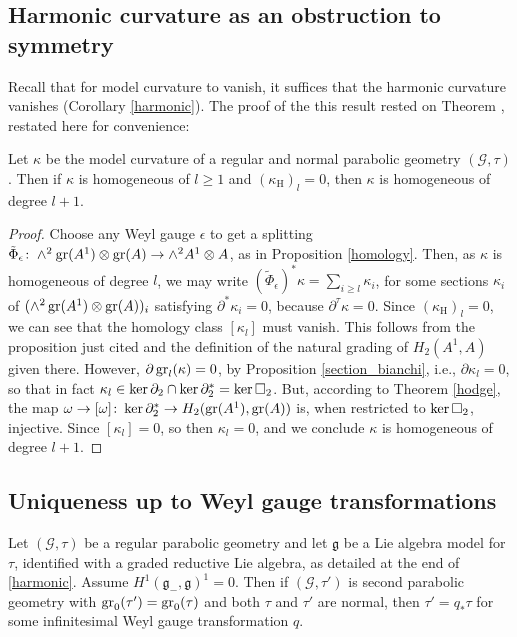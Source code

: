 \documentclass[leqno,12pt]{amsart} %
\begin{document}
\subsection{Harmonic curvature as an obstruction to symmetry}\label{top_curvature}
Recall that for model curvature to vanish, it suffices that the harmonic curvature
vanishes (Corollary \ref{harmonic}). The proof of the this result rested on Theorem
, restated here for convenience:

\begin{proposition}
  Let $\kappa $ be the model curvature of a regular and normal parabolic geometry
  $({\mathcal G} , \tau)$. Then if $\kappa $ is homogeneous of $l \ge 1$ and
  $(\kappa_{\mathrm H})_l = 0$, then $\kappa $ is homogeneous of degree $l + 1$.
\end{proposition}
\begin{proof}
  Choose any Weyl gauge $\epsilon$ to get a splitting
  $\tilde \Phi_\epsilon \colon \wedge^2 \operatorname{\operatorname{gr}}(A^1) \otimes \operatorname{\operatorname{gr}}(A) \rightarrow
  \wedge^2 A^1 \otimes A$, as in Proposition \ref{homology}. Then, as $\kappa $ is
  homogeneous of degree $l$, we may write
  $(\tilde \Phi_\epsilon)^*\kappa =\sum_{i\ge l} \kappa_i$, for some sections $\kappa_i$
  of $(\wedge^2 \operatorname{\operatorname{gr}}(A^1) \otimes \operatorname{\operatorname{gr}}(A))_i$ satisfying $\partial^* \kappa_i =0$,
  because $\partial^\tau \kappa = 0$. Since $(\kappa_{\mathrm H})_l = 0$, we can see that
  the homology class $[\kappa_l]$ must vanish. This follows from the proposition just
  cited and the definition of the natural grading of $H_2(A^1, A)$ given there. However,
  $\partial \operatorname{\operatorname{gr}}_l(\kappa) = 0$, by Proposition \ref{section_bianchi}, i.e.,
  $\partial \kappa_l = 0$, so that in fact
  $\kappa_l \in \operatorname{ker} \partial_2 \cap \operatorname{ker}\partial^*_2 = \operatorname{ker} \square_2$. But,
  according to Theorem \ref{hodge}, the map
  $\omega \rightarrow [\omega] \colon \operatorname{ker}\partial_2^* \rightarrow H_2(\operatorname{\operatorname{gr}}(A^1),
  \operatorname{\operatorname{gr}}(A))$ is, when restricted to $\operatorname{ker} \square_2$, injective. Since $[\kappa_l]=0$,
  so then $\kappa_l=0$, and we conclude $\kappa $ is homogeneous of degree $l + 1$.
\end{proof}

\subsection{Uniqueness up to Weyl gauge transformations}\label{un}

\begin{theorem}[Uniqueness] Let $({\mathcal G}, \tau)$ be a regular parabolic
  geometry and let ${\mathfrak g} $ be a Lie algebra model for $\tau $, identified with a
  graded reductive Lie algebra, as detailed at the end of \ref{harmonic}. Assume
  $H^1({\mathfrak g}_-, {\mathfrak g})^1=0$.  Then if $({\mathcal G}, \tau')$ is second
  parabolic geometry with $\operatorname{\operatorname{gr}}_0(\tau')=\operatorname{\operatorname{gr}}_0(\tau)$ and both $\tau $ and
  $\tau'$ are normal, then $\tau' = q_*\tau$ for some infinitesimal Weyl gauge
  transformation $q$.
\end{theorem}
\end{document}
